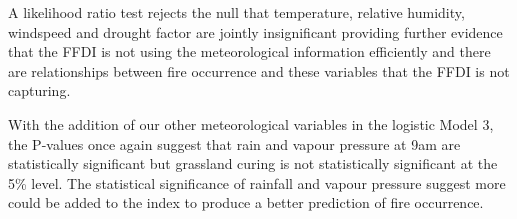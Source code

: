 \documentclass[11pt,a4paper]{article}
\begin{document}
A likelihood ratio test rejects the null that temperature, relative humidity, windspeed and drought factor are jointly insignificant providing further evidence that the FFDI is not using the meteorological information efficiently and there are relationships between fire occurrence and these variables that the FFDI is not capturing.


With the addition of our other meteorological variables in the logistic Model 3, the P-values once again suggest that rain and vapour pressure at 9am are statistically significant but grassland curing is not statistically significant at the 5\% level. The statistical significance of rainfall and vapour pressure suggest more could be added to the index to produce a better prediction of fire occurrence.
\end{document}
